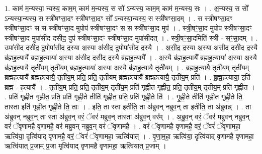\documentclass[17pt]{extarticle}
\begin{document}
1. काम॑ म॒न्यस्या॒ न्यस्य॒ काम॒म् काम॑ म॒न्यस्य॒ स सो᳚ ऽन्यस्य॒ काम॒म् काम॑ म॒न्यस्य॒ सः । . अ॒न्यस्य॒ स सो᳚ ऽन्यस्या॒न्यस्य॒ स स्त्री॑षꣳसा॒दꣳ स्त्री॑षꣳसा॒दꣳ सो᳚ ऽन्यस्या॒न्यस्य॒ स स्त्री॑षꣳसा॒दम् । . स स्त्री॑षꣳसा॒दꣳ स्त्री॑षꣳसा॒दꣳ स स स्त्री॑षꣳसा॒द मुपोप॑ स्त्रीषꣳसा॒दꣳ स स स्त्री॑षꣳसा॒द मुप॑ । . स्त्री॒षꣳ॒॒सा॒द मुपोप॑ स्त्रीषꣳसा॒दꣳ स्त्री॑षꣳसा॒द मुपा॑सीद दसीद॒ दुप॑ स्त्रीषꣳसा॒दꣳ स्त्री॑षꣳसा॒द मुपा॑सीदत् । . स्त्री॒षꣳ॒॒सा॒दमिति॑ स्त्री - सꣳ॒॒सा॒दम् । . उपा॑सीद दसीद॒ दुपोपा॑सीद द॒स्या अ॒स्या अ॑सीद॒ दुपोपा॑सीद द॒स्यै । . अ॒सी॒द॒ द॒स्या अ॒स्या अ॑सीद दसीद द॒स्यै ब्र॑ह्मह॒त्यायै᳚ ब्रह्मह॒त्याया॑ अ॒स्या अ॑सीद दसीद द॒स्यै ब्र॑ह्मह॒त्यायै᳚ । . अ॒स्यै ब्र॑ह्मह॒त्यायै᳚ ब्रह्मह॒त्याया॑ अ॒स्या अ॒स्यै ब्र॑ह्मह॒त्यायै॒ तृती॑य॒म् तृती॑यम् ब्रह्मह॒त्याया॑ अ॒स्या अ॒स्यै ब्र॑ह्मह॒त्यायै॒ तृती॑यम् । . ब्र॒ह्म॒ह॒त्यायै॒ तृती॑य॒म् तृती॑यम् ब्रह्मह॒त्यायै᳚ ब्रह्मह॒त्यायै॒ तृती॑य॒म् प्रति॒ प्रति॒ तृती॑यम् ब्रह्मह॒त्यायै᳚ ब्रह्मह॒त्यायै॒ तृती॑य॒म् प्रति॑ । . ब्र॒ह्म॒ह॒त्याया॒ इति॑ ब्रह्म - ह॒त्यायै᳚ । . तृती॑य॒म् प्रति॒ प्रति॒ तृती॑य॒म् तृती॑य॒म् प्रति॑ गृह्णीत गृह्णीत॒ प्रति॒ तृती॑य॒म् तृती॑य॒म् प्रति॑ गृह्णीत । . प्रति॑ गृह्णीत गृह्णीत॒ प्रति॒ प्रति॑ गृह्णी॒ते तीति॑ गृह्णीत॒ प्रति॒ प्रति॑ गृह्णी॒ते ति॑ । . गृ॒ह्णी॒ते तीति॑ गृह्णीत गृह्णी॒ते ति॒ तास्ता इति॑ गृह्णीत गृह्णी॒ते ति॒ ताः । . इति॒ ता स्ता इतीति॒ ता अ॑ब्रुवन् नब्रुव॒न् ता इतीति॒ ता अ॑ब्रुवन्न् । . ता अ॑ब्रुवन् नब्रुव॒न् ता स्ता अ॑ब्रुव॒न् वरं॒ ॅवर॑ मब्रुव॒न् तास्ता अ॑ब्रुव॒न् वर᳚म् । . अ॒ब्रु॒व॒न् वरं॒ ॅवर॑ मब्रुवन् नब्रुव॒न् वरं॑ ॅवृणामहै वृणामहै॒ वर॑ मब्रुवन् नब्रुव॒न् वरं॑ ॅवृणामहै । . वरं॑ ॅवृणामहै वृणामहै॒ वरं॒ ॅवरं॑ ॅवृणामहा॒ ऋत्वि॑या॒ दृत्वि॑याद् वृणामहै॒ वरं॒ ॅवरं॑ ॅवृणामहा॒ ऋत्वि॑यात् । . वृ॒णा॒म॒हा॒ ऋत्वि॑या॒ दृत्वि॑याद् वृणामहै वृणामहा॒ ऋत्वि॑यात् प्र॒जाम् प्र॒जा मृत्वि॑याद् वृणामहै वृणामहा॒ ऋत्वि॑यात् प्र॒जाम् । \newline
\end{document}
